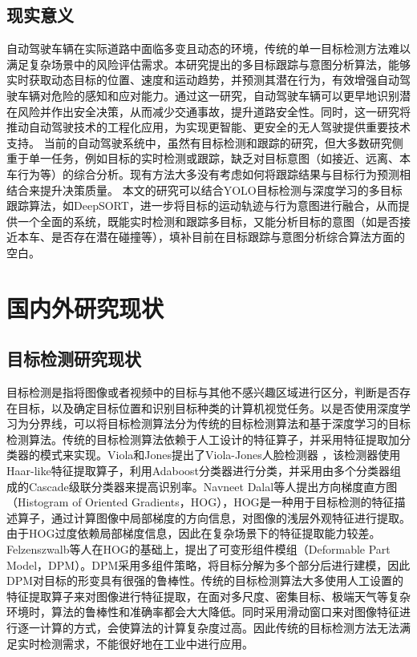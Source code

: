 \subsection{现实意义}

自动驾驶车辆在实际道路中面临多变且动态的环境，传统的单一目标检测方法难以满足复杂场景中的风险评估需求。本研究提出的多目标跟踪与意图分析算法，能够实时获取动态目标的位置、速度和运动趋势，并预测其潜在行为，有效增强自动驾驶车辆对危险的感知和应对能力。通过这一研究，自动驾驶车辆可以更早地识别潜在风险并作出安全决策，从而减少交通事故，提升道路安全性。同时，这一研究将推动自动驾驶技术的工程化应用，为实现更智能、更安全的无人驾驶提供重要技术支持。
当前的自动驾驶系统中，虽然有目标检测和跟踪的研究，但大多数研究侧重于单一任务，例如目标的实时检测或跟踪，缺乏对目标意图（如接近、远离、本车行为等）的综合分析。现有方法大多没有考虑如何将跟踪结果与目标行为预测相结合来提升决策质量。
本文的研究可以结合YOLO目标检测与深度学习的多目标跟踪算法，如DeepSORT，进一步将目标的运动轨迹与行为意图进行融合，从而提供一个全面的系统，既能实时检测和跟踪多目标，又能分析目标的意图（如是否接近本车、是否存在潜在碰撞等），填补目前在目标跟踪与意图分析综合算法方面的空白。

\section{国内外研究现状}

\subsection{目标检测研究现状}

目标检测是指将图像或者视频中的目标与其他不感兴趣区域进行区分，判断是否存在目标，以及确定目标位置和识别目标种类的计算机视觉任务。以是否使用深度学习为分界线，可以将目标检测算法分为传统的目标检测算法和基于深度学习的目标检测算法。传统的目标检测算法依赖于人工设计的特征算子，并采用特征提取加分类器的模式来实现。Viola和Jones提出了Viola-Jones人脸检测器 \cite{viola2001rapid}，该检测器使用Haar-like特征提取算子，利用Adaboost分类器进行分类，并采用由多个分类器组成的Cascade级联分类器来提高识别率。Navneet Dalal等人\cite{dalal2005histograms}提出方向梯度直方图（Histogram of Oriented Gradients，HOG），HOG是一种用于目标检测的特征描述算子，通过计算图像中局部梯度的方向信息，对图像的浅层外观特征进行提取。由于HOG过度依赖局部梯度信息，因此在复杂场景下的特征提取能力较差。Felzenszwalb等人\cite{felzenszwalb2009object}在HOG的基础上，提出了可变形组件模组（Deformable Part Model，DPM）。DPM采用多组件策略，将目标分解为多个部分后进行建模，因此DPM对目标的形变具有很强的鲁棒性。传统的目标检测算法大多使用人工设置的特征提取算子来对图像进行特征提取，在面对多尺度、密集目标、极端天气等复杂环境时，算法的鲁棒性和准确率都会大大降低。同时采用滑动窗口来对图像特征进行逐一计算的方式，会使算法的计算复杂度过高。因此传统的目标检测方法无法满足实时检测需求，不能很好地在工业中进行应用。

